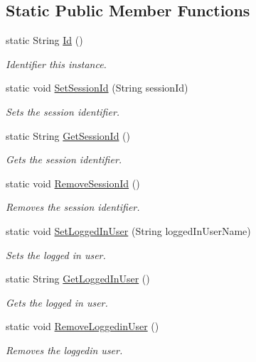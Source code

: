 \subsection*{Static Public Member Functions}
\begin{DoxyCompactItemize}
\item 
static String \hyperlink{classcom_1_1shephertz_1_1app42_1_1paas_1_1sdk_1_1csharp_1_1_installation_a5d85aaba5a26a8f8ac0d681b536ca75b}{Id} ()
\begin{DoxyCompactList}\small\item\em Identifier this instance. \end{DoxyCompactList}\item 
static void \hyperlink{classcom_1_1shephertz_1_1app42_1_1paas_1_1sdk_1_1csharp_1_1_installation_a8b4f96ae83f29279e6276fb496bc8cb9}{Set\+Session\+Id} (String session\+Id)
\begin{DoxyCompactList}\small\item\em Sets the session identifier. \end{DoxyCompactList}\item 
static String \hyperlink{classcom_1_1shephertz_1_1app42_1_1paas_1_1sdk_1_1csharp_1_1_installation_a752a99a09680c68a3d008a0d52cca3b8}{Get\+Session\+Id} ()
\begin{DoxyCompactList}\small\item\em Gets the session identifier. \end{DoxyCompactList}\item 
static void \hyperlink{classcom_1_1shephertz_1_1app42_1_1paas_1_1sdk_1_1csharp_1_1_installation_a837432a6ff9a286e18afc06dc1c40ab0}{Remove\+Session\+Id} ()
\begin{DoxyCompactList}\small\item\em Removes the session identifier. \end{DoxyCompactList}\item 
static void \hyperlink{classcom_1_1shephertz_1_1app42_1_1paas_1_1sdk_1_1csharp_1_1_installation_a1c41849cf7a558889621124f25a44211}{Set\+Logged\+In\+User} (String logged\+In\+User\+Name)
\begin{DoxyCompactList}\small\item\em Sets the logged in user. \end{DoxyCompactList}\item 
static String \hyperlink{classcom_1_1shephertz_1_1app42_1_1paas_1_1sdk_1_1csharp_1_1_installation_a37ffd4a01a2d8887a7bf89d5e3b4d444}{Get\+Logged\+In\+User} ()
\begin{DoxyCompactList}\small\item\em Gets the logged in user. \end{DoxyCompactList}\item 
static void \hyperlink{classcom_1_1shephertz_1_1app42_1_1paas_1_1sdk_1_1csharp_1_1_installation_ac754c68d806310d023435b4f961e8572}{Remove\+Loggedin\+User} ()
\begin{DoxyCompactList}\small\item\em Removes the loggedin user. \end{DoxyCompactList}\end{DoxyCompactItemize}
